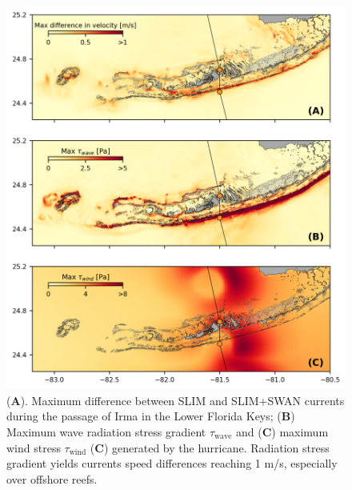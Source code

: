 \begin{figure}
    \centering
    \includegraphics[width=\textwidth]{chapters/irma/figures/max_diff_new.png}
    \caption{(\textbf{A}). Maximum difference between SLIM and SLIM+SWAN currents during the passage of Irma in the Lower Florida Keys; (\textbf{B}) Maximum wave radiation stress gradient {\boldmath$\tau$}$_\text{wave}$ and (\textbf{C}) maximum wind stress {\boldmath$\tau$}$_\text{wind}$ (\textbf{C}) generated by the hurricane. Radiation stress gradient yields currents speed differences reaching 1 m/s, especially over offshore reefs.}
    \label{fig:diff}
\end{figure}

